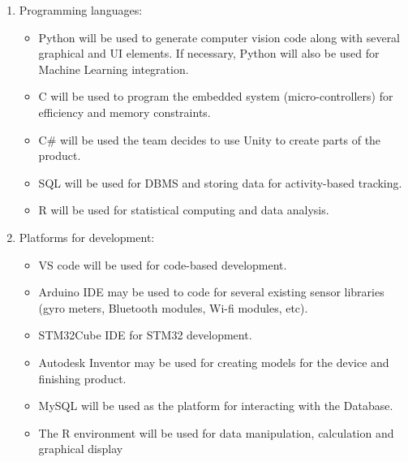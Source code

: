 \documentclass{article}
\begin{document}
\begin{enumerate}
\item Programming languages:
\begin{itemize}
\item Python will be used to generate computer vision code along with several graphical and UI elements. If necessary, Python will also be used for Machine Learning integration.
\item C will be used to program the embedded system (micro-controllers) for efficiency and memory constraints.
\item C\# will be used the team decides to use Unity to create parts of the product.
\item SQL will be used for DBMS and storing data for activity-based tracking.
\item R will be used for statistical computing and data analysis.
\end{itemize}
\item Platforms for development:
\begin{itemize}
\item VS code will be used for code-based development.
\item Arduino IDE may be used to code for several existing sensor libraries (gyro meters, Bluetooth modules, Wi-fi modules, etc).
\item STM32Cube IDE for STM32 development. 
\item Autodesk Inventor may be used for creating models for the device and finishing product.
\item MySQL will be used as the platform for interacting with the Database.
\item The R environment will be used for data manipulation, calculation and graphical display\\\\
\end{itemize}


\end{enumerate}
\end{document}
